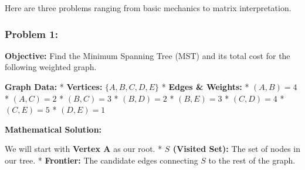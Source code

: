 \documentclass[
  letterpaper,
  DIV=11,
  numbers=noendperiod]{scrreprt}
\begin{document}
Here are three problems ranging from basic mechanics to matrix
interpretation.

\subsubsection{Problem 1:}\label{problem-1-1}

\textbf{Objective:} Find the Minimum Spanning Tree (MST) and its total
cost for the following weighted graph.

\textbf{Graph Data:} * \textbf{Vertices:} \(\{A, B, C, D, E\}\) *
\textbf{Edges \& Weights:} * \((A, B) = 4\) * \((A, C) = 2\) *
\((B, C) = 3\) * \((B, D) = 2\) * \((B, E) = 3\) * \((C, D) = 4\) *
\((C, E) = 5\) * \((D, E) = 1\)

\textbf{Mathematical Solution:}

We will start with \textbf{Vertex A} as our root. * \textbf{\(S\)
(Visited Set):} The set of nodes in our tree. * \textbf{Frontier:} The
candidate edges connecting \(S\) to the rest of the graph.
\end{document}
